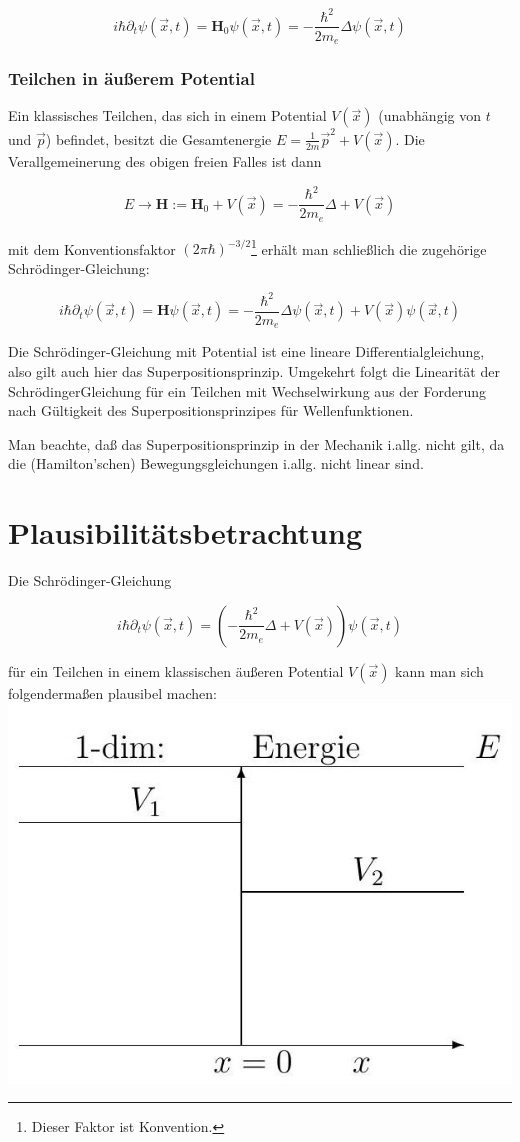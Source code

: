 \documentclass[10pt, letterpaper]{article}
\begin{document}
$$
i \hbar \partial_{t} \psi(\vec{x}, t)=\mathbf{H}_{0} \psi(\vec{x}, t)=-\frac{\hbar^{2}}{2 m_{e}} \Delta \psi(\vec{x}, t)
$$

\subsubsection*{Teilchen in äußerem Potential}
Ein klassisches Teilchen, das sich in einem Potential $V(\vec{x})$ (unabhängig von $t$ und $\vec{p}$) befindet, besitzt die Gesamtenergie $E=\frac{1}{2 m} \vec{p}^{2}+V(\vec{x})$. Die Verallgemeinerung des obigen freien Falles ist dann

$$
E \rightarrow \mathbf{H}:=\mathbf{H}_{0}+V(\vec{x})=-\frac{\hbar^{2}}{2 m_{e}} \Delta+V(\vec{x})
$$

mit dem Konventionsfaktor $(2 \pi \hbar)^{-3/2}$\footnote{Dieser Faktor ist Konvention.} erhält man schließlich die zugehörige Schrödinger-Gleichung:

$$
i \hbar \partial_{t} \psi(\vec{x}, t)=\mathbf{H} \psi(\vec{x}, t)=-\frac{\hbar^{2}}{2 m_{e}} \Delta \psi(\vec{x}, t)+V(\vec{x}) \psi(\vec{x}, t)
$$

Die Schrödinger-Gleichung mit Potential ist eine lineare Differentialgleichung, also gilt auch hier das Superpositionsprinzip. Umgekehrt folgt die Linearität der SchrödingerGleichung für ein Teilchen mit Wechselwirkung aus der Forderung nach Gültigkeit des Superpositionsprinzipes für Wellenfunktionen.

Man beachte, daß das Superpositionsprinzip in der Mechanik i.allg. nicht gilt, da die (Hamilton'schen) Bewegungsgleichungen i.allg. nicht linear sind.

\section*{Plausibilitätsbetrachtung}
Die Schrödinger-Gleichung

$$
i \hbar \partial_{t} \psi(\vec{x}, t)=\left(-\frac{\hbar^{2}}{2 m_{e}} \Delta+V(\vec{x})\right) \psi(\vec{x}, t)
$$

für ein Teilchen in einem klassischen äußeren Potential $V(\vec{x})$ kann man sich folgendermaßen plausibel machen:\\
\includegraphics[scale=0.2, center]{2025_05_21_11b1754c718f6fcf84f8g-08}
\end{document}
